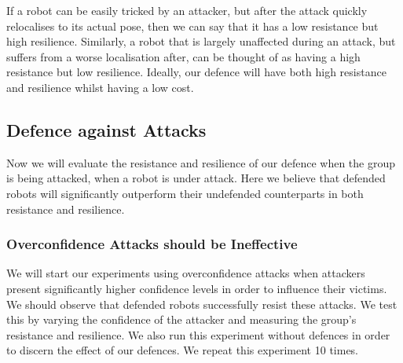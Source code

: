 If a robot can be easily tricked by an attacker, but after the attack quickly relocalises to its actual pose, then we can say that it has a low resistance but high resilience. Similarly, a robot that is largely unaffected during an attack, but suffers from a worse localisation after, can be thought of as having a high resistance but low resilience. Ideally, our defence will have both high resistance and resilience whilst having a low cost.

\subsection{Defence against Attacks}
Now we will evaluate the resistance and resilience of our defence when the group is being attacked, when a robot is under attack. Here we believe that defended robots will significantly outperform their undefended counterparts in both resistance and resilience.

\subsubsection{Overconfidence Attacks should be Ineffective}
We will start our experiments using overconfidence attacks when attackers present significantly higher confidence levels in order to influence their victims. We should observe that defended robots successfully resist these attacks. We test this by varying the confidence of the attacker and measuring the group's resistance and resilience. We also run this experiment without defences in order to discern the effect of our defences. We repeat this experiment 10 times.

